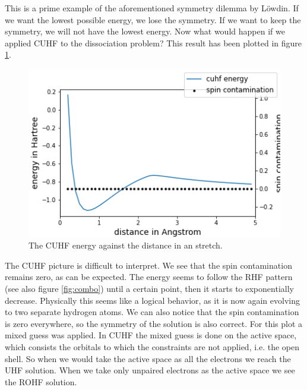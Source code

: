 \documentclass[twoside,twocolumn,9pt]{article}
\begin{document}
This is a prime example of the aforementioned symmetry dilemma by Löwdin. If we want the lowest possible energy, we lose the symmetry. If we want to keep the symmetry, we will not
have the lowest energy. Now what would happen if we applied CUHF to the dissociation problem? This result has been plotted in figure \ref{fig:cuhfstretch}.
\begin{center}
  \begin{figure}[h]
    \includegraphics[width=\linewidth]{./../notes/figures/cuhf_mix.png}
    \caption{The CUHF energy against the distance in an  stretch.}
    \label{fig:cuhfstretch}
  \end{figure}
\end{center}
The CUHF picture is difficult to interpret. We see that the spin contamination remains zero, as can be expected. The energy seems to follow the RHF pattern (see also figure
\ref{fig:combo}) until a certain point, then it starts to exponentially decrease. Physically this seems like a logical behavior, as it is now again evolving to two separate hydrogen
atoms. We can also notice
that the spin contamination is zero everywhere, so the symmetry of the solution is also correct. For this plot a mixed guess was applied. In CUHF the mixed guess is done on the
active space, which consists the orbitals to which the constraints are not applied, i.e. the open shell\cite{Scuseria2011}. So when we would take the active space as all the electrons
we reach the UHF solution. When we take only unpaired electrons as the active space we see the ROHF solution.
\end{document}
